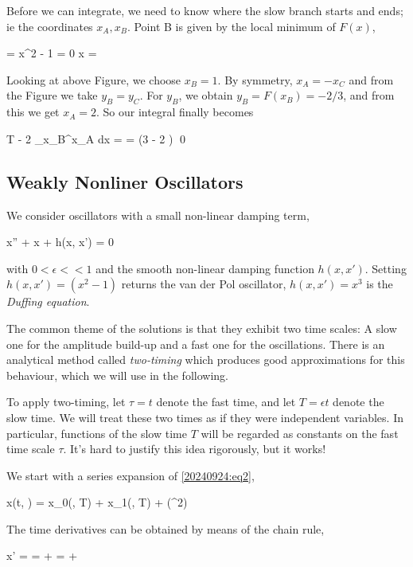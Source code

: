 Before we can integrate, we need to know where the slow branch starts and ends; ie the coordinates $x_A, x_B$. Point B is given by the local minimum of $F(x)$,

\bee
{} = x^2 - 1 = 0 \rightarrow x = 
\eee

Looking at above Figure, we choose $x_B = 1$. By symmetry, $x_A = - x_C$ and from the Figure we take $y_B = y_C$. For $y_B$, we obtain $y_B = F(x_B) = -2/3$, and from this we get $x_A = 2$. So our integral finally becomes

\bee
T \approx - 2 \int_{x_B}^{x_A}  dx = \cdots = \mu (3 - 2 ) \qed
\eee

\subsection{Weakly Nonliner Oscillators}

We consider oscillators with a small non-linear damping term,

\be\label{20240924:eq2}
x''  + x + \epsilon h(x, x') = 0
\ee

with $0 < \epsilon << 1$ and the smooth non-linear damping function $h(x, x')$. Setting $h(x, x') = (x^2-1)$ returns the van der Pol oscillator, $h(x, x') = x^3$ is the \emph{Duffing equation}.

The common theme of the solutions is that they exhibit two time scales: A slow one for the amplitude build-up and a fast one for the oscillations. There is an analytical method called \emph{two-timing} which produces good approximations for this behaviour, which we will use in the following.

To apply two-timing, let $\tau = t$ denote the fast time, and let $T = \epsilon t$ denote the slow time. We will treat these two times as if they were independent variables. In particular, functions of the slow time $T$ will be regarded as constants on the fast time scale $\tau$. It’s hard to justify this idea rigorously, but it works!

We start with a series expansion of \eqref{20240924:eq2},

\be\label{20240924:eq3}
x(t, \epsilon) = x_0(\tau, T) + \epsilon x_1(\tau, T) + \Oc(\epsilon^2)
\ee

The time derivatives can be obtained by means of the chain rule,

\bee
x' =  =  +   =  + \epsilon {}
\eee

